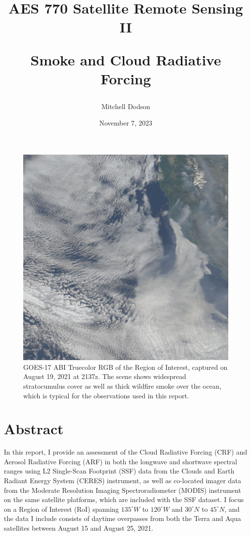 \documentclass[12pt]{article}
\title{AES 770 Satellite Remote Sensing II

Smoke and Cloud Radiative Forcing}
\author{Mitchell Dodson}
\date{November 7, 2023}
\begin{document}
\maketitle

\vspace{-2em}

\begin{figure}[h!]
    \centering
    \includegraphics[width=.5\paperwidth]{figs/cover.png}
    \caption{GOES-17 ABI Truecolor RGB of the Region of Interest, captured on August 19, 2021 at 2137z. The scene shows widespread stratocumulus cover as well as thick wildfire smoke over the ocean, which is typical for the observations used in this report.}
    \label{cover}
\end{figure}

\vspace{-1em}

\section{Abstract}

In this report, I provide an assessment of the Cloud Radiative Forcing (CRF) and Aerosol Radiative Forcing (ARF) in both the longwave and shortwave spectral ranges using L2 Single-Scan Footprint (SSF) data from the Clouds and Earth Radiant Energy System (CERES) instrument, as well as co-located imager data from the Moderate Resolution Imaging Spectroradiometer (MODIS) instrument on the same satellite platforms, which are included with the SSF dataset. I focus on a Region of Interest (RoI) spanning $135^\circ W$ to $120^\circ W$ and $30^\circ N$ to $45^\circ N$, and the data I include consists of daytime overpasses from both the Terra and Aqua satellites between August 15 and August 25, 2021.
\end{document}
